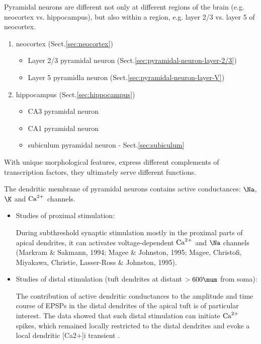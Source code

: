 Pyramidal neurons are different not only at different regions of the brain
(e.g. neocortex vs. hippocampus), but also within a region, e.g. layer 2/3 vs.
layer 5 of neocortex.
\begin{enumerate}
  \item neocortex (Sect.\ref{sec:neocortex})
  \begin{itemize}
  \item Layer 2/3 pyramidal neuron (Sect.\ref{sec:pyramidal-neuron-layer-2/3})
  
  \item Layer 5 pyramidla neuron (Sect.\ref{sec:pyramidal-neuron-layer-V}) 

  \end{itemize}

 \item hippocampus (Sect.\ref{sec:hippocampus})
 \begin{itemize}
  \item CA3 pyramidal neuron
  
  \item CA1 pyramidal neuron
  
  \item subiculum pyramidal neuron - Sect.\ref{sec:subiculum}
 \end{itemize}  
\end{enumerate}
With unique morphological features, express different complements of
transcription factors, they ultimately serve different functions.


The dendritic membrane of pyramidal neurons contains active conductances: $\Na$,
$\K$ and ${\text{Ca}^{2+}}$ channels. 
\begin{itemize}
  \item Studies of proximal stimulation: 

During subthreshold synaptic stimulation
mostly in the proximal parts of apical dendrites, it can activates voltage-dependent ${\text{Ca}^{2+}}$ and
$\Na$ channels (Markram \& Sakmann, 1994; Magee \& Johnston, 1995; Magee,
Christofi, Miyakawa, Christie, Lasser-Ross \& Johnston, 1995). 

  \item Studies of distal stimulation (tuft dendrites at distant $> 600\mum$
  from soma):
  
  The contribution of active dendritic conductances to the amplitude and time
  course of EPSPs in the distal dendrites of the apical tuft is of particular
  interest. The data showed that such distal stimulation can initiate ${\text{Ca}^{2+}}$
  spikes, which remained locally restricted to the distal dendrites and evoke a
  local dendritic [Ca2+]i transient \citep{schiller1997}.
  
\end{itemize}





